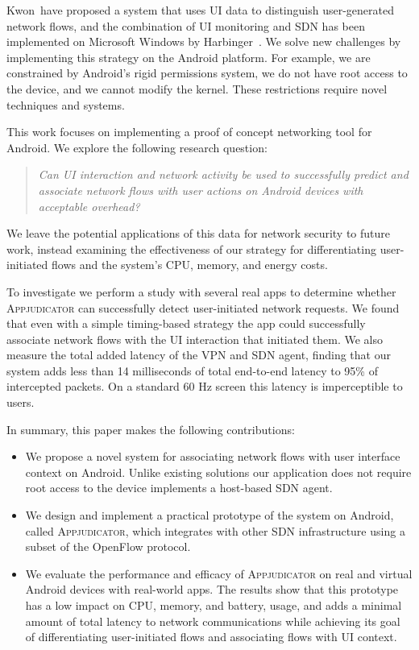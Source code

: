 Kwon~\etal have proposed a system that uses UI data to distinguish
user-generated network flows, and the combination of UI monitoring and SDN has
been implemented on Microsoft Windows by Harbinger~\cite{chuluundorj2019}.  We
solve new challenges by implementing this strategy on the Android platform. For
example, we are constrained by Android's rigid permissions system, we do not
have root access to the device, and we cannot modify the kernel. These
restrictions require novel techniques and systems.

This work focuses on implementing a proof of concept networking tool for
Android. We explore the following research question:
\begin{quote}
	\textit{Can UI interaction and network activity be used to successfully
		predict and associate network flows with user actions on Android devices
		with acceptable overhead?}
\end{quote}
We leave the potential applications of this data for network security to future
work, instead examining the effectiveness of our strategy for differentiating
user-initiated flows and the system's CPU, memory, and energy costs.

To investigate we perform a study with several real apps to determine whether
\textsc{Appjudicator} can successfully detect user-initiated network
requests. We found that even with a simple timing-based strategy the app could
successfully associate network flows with the UI interaction that initiated
them. We also measure the total added latency of the VPN and SDN agent, finding
that our system adds less than 14 milliseconds of total end-to-end latency to
95\% of intercepted packets. On a standard 60 Hz screen this latency is
imperceptible to users.

In summary, this paper makes the following contributions:

\begin{itemize}
	\item We propose a novel system for associating network flows with user
		interface context on Android. Unlike existing solutions our application
		does not require root access to the device implements a host-based SDN
		agent.
	\item We design and implement a practical prototype of the system on
		Android, called \textsc{Appjudicator}, which integrates with other SDN
		infrastructure using a subset of the OpenFlow protocol.
	\item We evaluate the performance and efficacy of \textsc{Appjudicator} on
		real and virtual Android devices with real-world apps. The results show
		that this prototype has a low impact on CPU, memory, and battery, usage,
		and adds a minimal amount of total latency to network communications
		while achieving its goal of differentiating user-initiated flows and
		associating flows with UI context.
\end{itemize}

\newpage
